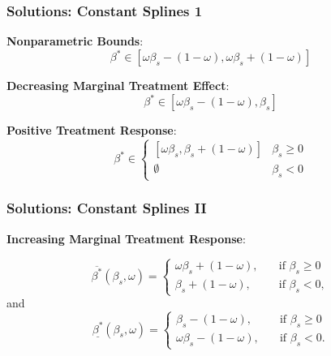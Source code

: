 \documentclass[11pt, aspectratio=169]{beamer}
\begin{document}
\begin{frame}
    \frametitle{Solutions: Constant Splines 1}

    \textbf{Nonparametric Bounds}:
    \begin{equation*}
        \beta^* \in [\omega\beta_s - (1 - \omega), \omega\beta_s + (1 - \omega)]
    \end{equation*}

    \vspace{0.5cm}

    \textbf{Decreasing Marginal Treatment Effect}:
    \begin{equation*}
        \beta^* \in [\omega\beta_s - (1 - \omega), \beta_s]
    \end{equation*}

    \vspace{0.5cm}

    \textbf{Positive Treatment Response}:
    \begin{equation*}
        \beta^* \in \begin{cases}
            [\omega\beta_s, \beta_s + (1 - \omega)] & \beta_s \geq 0 \\
            \emptyset & \beta_s < 0
        \end{cases}
    \end{equation*}

\end{frame}

\begin{frame}
    \frametitle{Solutions: Constant Splines II}

    \textbf{Increasing Marginal Treatment Response}:

    \begin{equation}\label{eq:solution_cs_increasing_mtr_upper}
        \overline{\beta^*}(\beta_s, \omega)=
        \begin{cases}
            \omega \beta_s + (1 - \omega),& \quad \text{if } \beta_s \geq 0\\
            \beta_s + (1 - \omega),              & \quad \text{if } \beta_s < 0,
        \end{cases}
    \end{equation}
    and
    \begin{equation}\label{eq:solution_cs_increasing_mtr_lower}
        \underline{\beta^*}(\beta_s, \omega)=
        \begin{cases}
            \beta_s - (1 - \omega),& \quad \text{if } \beta_s \geq 0\\
            \omega \beta_s - (1 - \omega),              & \quad \text{if } \beta_s < 0.
        \end{cases}
    \end{equation}

\end{frame}
\end{document}
